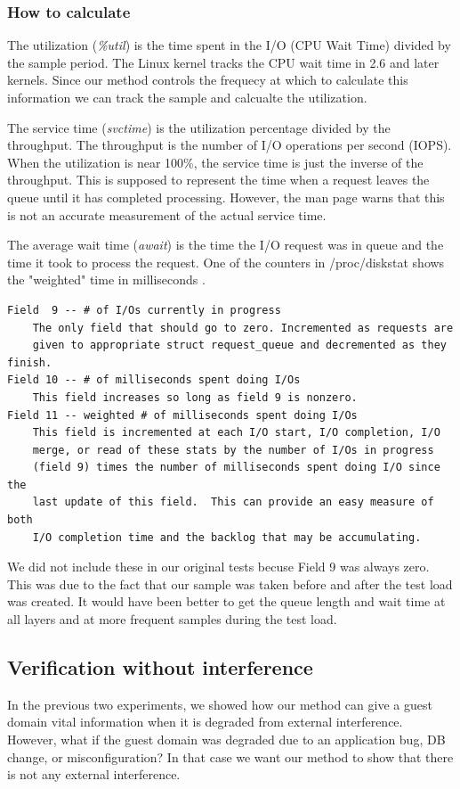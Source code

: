 \subsubsection{How to calculate}
The utilization (\emph{\%util}) is the time spent in the I/O (CPU Wait Time) divided by the sample period.  The Linux kernel tracks the CPU wait time in 2.6 and later kernels.  Since our method controls the frequecy at which to calculate this information we can track the sample and calcualte the utilization.

The service time (\emph{svctime}) is the utilization percentage divided by the throughput.  The throughput is the number of I/O operations per second (IOPS).  When the utilization is near 100\%, the service time is just the inverse of the throughput. This is supposed to represent the time when a request leaves the queue until it has completed processing.  However, the man page warns that this is not an accurate measurement of the actual service time.

The average wait time (\emph{await}) is the time the I/O request was in queue and the time it took to process the request.  One of the counters in /proc/diskstat shows the "weighted" time in milliseconds \cite{iostats}.  

\begin{Verbatim}
Field  9 -- # of I/Os currently in progress
    The only field that should go to zero. Incremented as requests are
    given to appropriate struct request_queue and decremented as they finish.
Field 10 -- # of milliseconds spent doing I/Os
    This field increases so long as field 9 is nonzero.
Field 11 -- weighted # of milliseconds spent doing I/Os
    This field is incremented at each I/O start, I/O completion, I/O
    merge, or read of these stats by the number of I/Os in progress
    (field 9) times the number of milliseconds spent doing I/O since the
    last update of this field.  This can provide an easy measure of both
    I/O completion time and the backlog that may be accumulating.
\end{Verbatim}

We did not include these in our original tests becuse Field 9 was always zero.  This was due to the fact that our sample was taken before and after the test load was created.  It would have been better to get the queue length and wait time at all layers and at more frequent samples during the test load.


\subsection{Verification without interference}
In the previous two experiments, we showed how our method can give a guest domain vital information when it is degraded from external interference.  However, what if the guest domain was degraded due to an application bug, DB change, or misconfiguration?   In that case we want our method to show that there is not any external interference.

